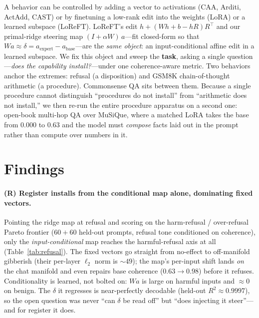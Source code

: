 \documentclass{article}
\begin{document}
A behavior can be controlled by adding a vector to activations (CAA, Arditi, ActAdd, CAST) or by
finetuning a low-rank edit into the weights (LoRA) or a learned subspace (LoReFT). LoReFT's edit
$h + (Wh + b - hR)R^{\top}$ and our primal-ridge steering map $(I + \alpha W)\,a$---fit closed-form so
that $W a \approx \delta = a_{\text{expert}} - a_{\text{base}}$---are the \emph{same object}: an
input-conditional affine edit in a learned subspace. We fix this object and sweep the \textbf{task},
asking a single question---\emph{does the capability install?}---under one coherence-aware metric. Two
behaviors anchor the extremes: refusal (a disposition) and GSM8K chain-of-thought arithmetic (a
procedure). Commonsense QA sits between them. Because a single procedure cannot distinguish
``procedures do not install'' from ``arithmetic does not install,'' we then re-run the entire
procedure apparatus on a second one: open-book multi-hop QA over MuSiQue, where a matched LoRA takes
the base from $0.000$ to $0.63$ and the model must \emph{compose} facts laid out in the prompt rather
than compute over numbers in it.

\section{Findings}

\paragraph{(R) Register installs from the conditional map alone, dominating fixed vectors.}
Pointing the ridge map at refusal and scoring on the harm-refusal / over-refusal Pareto frontier
($60{+}60$ held-out prompts, refusal tone conditioned on coherence), only the \emph{input-conditional}
map reaches the harmful-refusal axis at all (Table~\ref{tab:refusal}). The fixed vectors go straight
from no-effect to off-manifold gibberish (their per-layer $\ell_2$ norm is ${\sim}49$); the map's
per-input shift lands \emph{on} the chat manifold and even repairs base coherence ($0.63 \to 0.98$)
before it refuses. Conditionality is learned, not bolted on: $W a$ is large on harmful inputs and
$\approx 0$ on benign. The $\delta$ it regresses is near-perfectly decodable (held-out
$R^2 \approx 0.9997$), so the open question was never ``can $\delta$ be read off'' but ``does injecting
it steer''---and for register it does.
\end{document}
